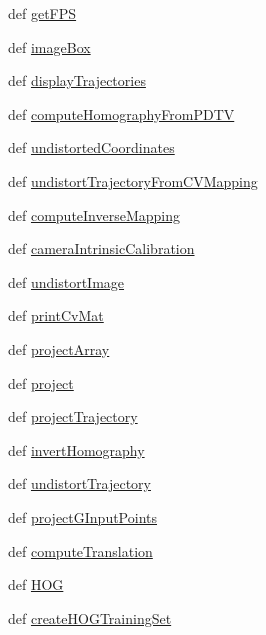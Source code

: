 \begin{DoxyCompactItemize}
\item 
def \hyperlink{namespacecvutils_a475ad819fe471fdb7259769a00cc1d8b}{get\-F\-P\-S}
\item 
def \hyperlink{namespacecvutils_aec638ebe8ce12028f9c1dbe1973560a1}{image\-Box}
\item 
def \hyperlink{namespacecvutils_ac88aff887440e5d3dd4a38e5549207a2}{display\-Trajectories}
\item 
def \hyperlink{namespacecvutils_ad02a594185748c2ac2735a2eb40fc04b}{compute\-Homography\-From\-P\-D\-T\-V}
\item 
def \hyperlink{namespacecvutils_af3a8e3f8f019cf416f3132af29ddc1c8}{undistorted\-Coordinates}
\item 
def \hyperlink{namespacecvutils_a5ae67c331efa75df977e77cd30bfdb51}{undistort\-Trajectory\-From\-C\-V\-Mapping}
\item 
def \hyperlink{namespacecvutils_a3c828edc862a20c8b846f2dcd931c240}{compute\-Inverse\-Mapping}
\item 
def \hyperlink{namespacecvutils_abe7abbdde166d609679b903ef2f326be}{camera\-Intrinsic\-Calibration}
\item 
def \hyperlink{namespacecvutils_ac27f0883bcd8c0f4be605020243d4995}{undistort\-Image}
\item 
def \hyperlink{namespacecvutils_af42a1d493f941024268f27b6ac8ab150}{print\-Cv\-Mat}
\item 
def \hyperlink{namespacecvutils_a0ec21be4fe1491cec23252672d90564c}{project\-Array}
\item 
def \hyperlink{namespacecvutils_a0a2068ad692d82e53d5c35d38798682f}{project}
\item 
def \hyperlink{namespacecvutils_afee334c2afe6c1327ba7833c2b7a0e8e}{project\-Trajectory}
\item 
def \hyperlink{namespacecvutils_a0c2c4574d510683c40ddb323f588e10d}{invert\-Homography}
\item 
def \hyperlink{namespacecvutils_aaee2607a9a743495c187634eac53a6d1}{undistort\-Trajectory}
\item 
def \hyperlink{namespacecvutils_ae78773f367f3b2ed789afe6da5c1c486}{project\-G\-Input\-Points}
\item 
def \hyperlink{namespacecvutils_a4a56886f5e5a4ceefd1835a457ba5229}{compute\-Translation}
\item 
def \hyperlink{namespacecvutils_a619102306502945842893fa5b60fdf41}{H\-O\-G}
\item 
def \hyperlink{namespacecvutils_a636b5f783d3957c84e2e3ffb69b6262f}{create\-H\-O\-G\-Training\-Set}
\end{DoxyCompactItemize}

